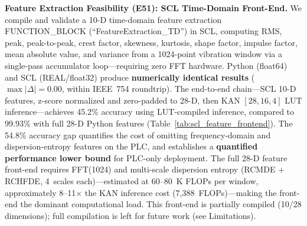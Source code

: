 \documentclass[journal,onecolumn]{IEEEtran}
\begin{document}
\vspace{4pt}
\noindent\textbf{Feature Extraction Feasibility (E51): SCL Time-Domain Front-End.}
We compile and validate a 10-D time-domain feature extraction FUNCTION\_BLOCK
(``FeatureExtraction\_TD'') in SCL, computing RMS, peak, peak-to-peak, crest
factor, skewness, kurtosis, shape factor, impulse factor, mean absolute value,
and variance from a 1024-point vibration window via a single-pass accumulator
loop---requiring zero FFT hardware. Python (float64) and SCL (REAL/float32)
produce \textbf{numerically identical results} ($\max|\Delta| = 0.00$, within IEEE~754
roundtrip). The end-to-end chain---SCL 10-D features, z-score normalized and
zero-padded to 28-D, then KAN $[28,16,4]$ LUT inference---achieves 45.2\%
accuracy using LUT-compiled inference, compared to 99.93\% with full 28-D Python
features (Table~\ref{tab:scl_feature_frontend}). The 54.8\% accuracy gap
quantifies the cost of omitting frequency-domain and dispersion-entropy features
on the PLC, and establishes a \textbf{quantified performance lower bound} for
PLC-only deployment. The full 28-D feature front-end requires FFT(1024) and
multi-scale dispersion entropy (RCMDE + RCHFDE, 4~scales each)---estimated at
60--80~K FLOPs per window, approximately 8--11$\times$ the KAN inference cost
(7,388~FLOPs)---making the front-end the dominant computational load. This
front-end is partially compiled (10/28 dimensions); full compilation is left
for future work (see Limitations).
\end{document}
